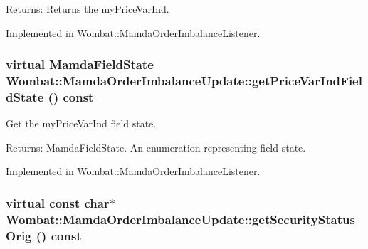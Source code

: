 \begin{Desc}
\item[Returns:]Returns the my\-Price\-Var\-Ind. \end{Desc}


Implemented in \hyperlink{classWombat_1_1MamdaOrderImbalanceListener_dcb92d290caa24fbf12d5521f5917fe4}{Wombat::Mamda\-Order\-Imbalance\-Listener}.\hypertarget{classWombat_1_1MamdaOrderImbalanceUpdate_d39f5c530b11d89f10c21d9307dfc4c3}{
\subsubsection[getPriceVarIndFieldState]{\setlength{\rightskip}{0pt plus 5cm}virtual \hyperlink{namespaceWombat_93aac974f2ab713554fd12a1fa3b7d2a}{Mamda\-Field\-State} Wombat::Mamda\-Order\-Imbalance\-Update::get\-Price\-Var\-Ind\-Field\-State () const}}
\label{classWombat_1_1MamdaOrderImbalanceUpdate_d39f5c530b11d89f10c21d9307dfc4c3}


Get the my\-Price\-Var\-Ind field state. 

\begin{Desc}
\item[Returns:]Mamda\-Field\-State. An enumeration representing field state. \end{Desc}


Implemented in \hyperlink{classWombat_1_1MamdaOrderImbalanceListener_b59ba04652f3f591eab16bd569caa711}{Wombat::Mamda\-Order\-Imbalance\-Listener}.\hypertarget{classWombat_1_1MamdaOrderImbalanceUpdate_4431d1fef6fab38116d2ecf8b3a404f9}{
\subsubsection[getSecurityStatusOrig]{\setlength{\rightskip}{0pt plus 5cm}virtual const char$\ast$ Wombat::Mamda\-Order\-Imbalance\-Update::get\-Security\-Status\-Orig () const}}
\label{classWombat_1_1MamdaOrderImbalanceUpdate_4431d1fef6fab38116d2ecf8b3a404f9}


